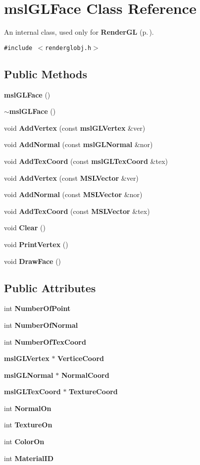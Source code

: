 \section{msl\-GLFace  Class Reference}
\label{classmslGLFace}
An internal class, used only for {\bf Render\-GL} {\rm (p.\,\pageref{classRenderGL})}. 


{\tt \#include $<$renderglobj.h$>$}

\subsection*{Public Methods}
\begin{CompactItemize}
\item 
{\bf msl\-GLFace} ()
\item 
{\bf $\sim$msl\-GLFace} ()
\item 
void {\bf Add\-Vertex} (const {\bf msl\-GLVertex} \&ver)
\item 
void {\bf Add\-Normal} (const {\bf msl\-GLNormal} \&nor)
\item 
void {\bf Add\-Tex\-Coord} (const {\bf msl\-GLTex\-Coord} \&tex)
\item 
void {\bf Add\-Vertex} (const {\bf MSLVector} \&ver)
\item 
void {\bf Add\-Normal} (const {\bf MSLVector} \&nor)
\item 
void {\bf Add\-Tex\-Coord} (const {\bf MSLVector} \&tex)
\item 
void {\bf Clear} ()
\item 
void {\bf Print\-Vertex} ()
\item 
void {\bf Draw\-Face} ()
\end{CompactItemize}
\subsection*{Public Attributes}
\begin{CompactItemize}
\item 
int {\bf Number\-Of\-Point}
\item 
int {\bf Number\-Of\-Normal}
\item 
int {\bf Number\-Of\-Tex\-Coord}
\item 
{\bf msl\-GLVertex} $\ast$ {\bf Vertice\-Coord}
\item 
{\bf msl\-GLNormal} $\ast$ {\bf Normal\-Coord}
\item 
{\bf msl\-GLTex\-Coord} $\ast$ {\bf Texture\-Coord}
\item 
int {\bf Normal\-On}
\item 
int {\bf Texture\-On}
\item 
int {\bf Color\-On}
\item 
int {\bf Material\-ID}
\end{CompactItemize}


